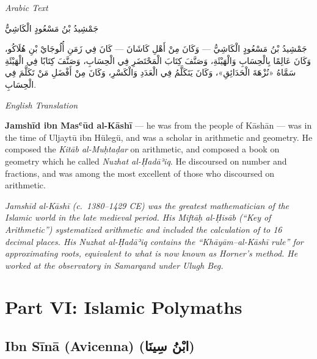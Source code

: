 \documentclass[11pt,a4paper]{article}
\def\RL#1{\beginR#1\endR}
\newcommand{\cnote}[1]{\textcolor{notecolor}{\textit{#1}}}
\newcommand{\textarabic}[1]{{\arabicfont\RL{#1}}}
\newenvironment{arabiccol}{%
  \begin{minipage}[t]{0.48\textwidth}%
  \begin{tcolorbox}[colback=leftbg,colframe=rulecolor,boxrule=0.4pt,arc=2pt,left=5pt,right=5pt,top=5pt,bottom=5pt]%
  \centering\textit{\footnotesize Arabic Text}\\[0.4em]%
  \raggedright\arabicfont\small%
}{%
  \end{tcolorbox}%
  \end{minipage}%
}
\newenvironment{englishcol}{%
  \begin{minipage}[t]{0.48\textwidth}%
  \begin{tcolorbox}[colback=rightbg,colframe=rulecolor,boxrule=0.4pt,arc=2pt,left=5pt,right=5pt,top=5pt,bottom=5pt]%
  \centering\textit{\footnotesize English Translation}\\[0.4em]%
  \raggedright\small%
}{%
  \end{tcolorbox}%
  \end{minipage}%
}
\begin{document}
\noindent
\begin{arabiccol}
\beginR
جَمْشِيدُ بْنُ مَسْعُودٍ الْكَاشِيُّ

جَمْشِيدُ بْنُ مَسْعُودٍ الْكَاشِيُّ — وَكَانَ مِنْ أَهْلِ كَاشَانَ — كَانَ فِي زَمَنِ أُلُوجَايْ بْنِ هُلَاكُو، وَكَانَ عَالِمًا بِالْحِسَابِ وَالْهَيْئَةِ، وَصَنَّفَ كِتَابَ الْمَحْتَضَرِ فِي الْحِسَابِ، وَصَنَّفَ كِتَابًا فِي الْهَيْئَةِ سَمَّاهُ «نُزْهَةَ الْحَدَائِقِ»، وَكَانَ يَتَكَلَّمُ فِي الْعَدَدِ وَالْكَسْرِ، وَكَانَ مِنْ أَفْضَلِ مَنْ تَكَلَّمَ فِي الْحِسَابِ.
\endR
\end{arabiccol}
\hfill
\begin{englishcol}
\textbf{Jamshīd ibn Masʿūd al-Kāshī} --- he was from the people of Kāshān --- was in the time of Uljaytū ibn Hülegü, and was a scholar in arithmetic and geometry. He composed the \textit{Kitāb al-Muḥtaḍar} on arithmetic, and composed a book on geometry which he called \textit{Nuzhat al-Ḥadāʾiq}. He discoursed on number and fractions, and was among the most excellent of those who discoursed on arithmetic.

\cnote{Jamshīd al-Kāshī (c.~1380--1429 CE) was the greatest mathematician of the Islamic world in the late medieval period. His \textit{Miftāḥ al-Ḥisāb} (``Key of Arithmetic'') systematized arithmetic and included the calculation of \pi to 16 decimal places. His \textit{Nuzhat al-Ḥadāʾiq} contains the ``Khāyām--al-Kāshī rule'' for approximating roots, equivalent to what is now known as Horner's method. He worked at the observatory in Samarqand under Ulugh Beg.}
\end{englishcol}

\par\vspace{0.5em}

\newpage

\section{Part VI: Islamic Polymaths}
\label{sec:islamic-polymaths}

\subsection{Ibn Sīnā (Avicenna) (\textarabic{ابْنُ سِينَا})}
\end{document}
